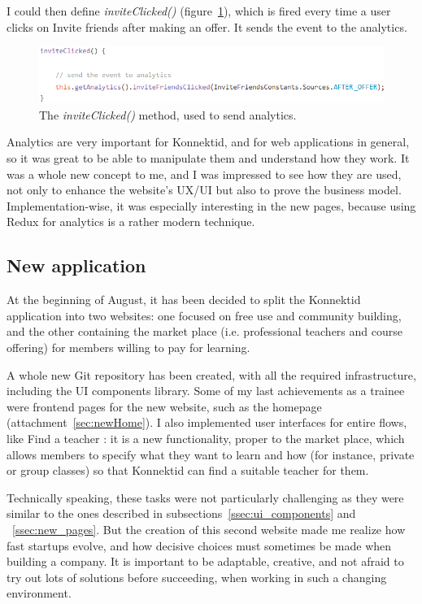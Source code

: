 I could then define \textit{inviteClicked()} ({\sc figure}~\ref{fig:inviteClicked}), which is fired every time a user clicks on Invite friends after making an offer. It sends the event to the analytics. 

\begin{figure}[H]
    \centering
    \includegraphics[scale=0.9]{figure/inviteClicked.png}
    \caption{The \textit{inviteClicked()} method, used to send analytics.}
    \label{fig:inviteClicked}
\end{figure}

Analytics are very important for Konnektid, and for web applications in general, so it was great to be able to manipulate them and understand how they work. It was a whole new concept to me, and I was impressed to see how they are used, not only to enhance the website's UX/UI but also to prove the business model. Implementation-wise, it was especially interesting in the new pages, because using Redux for analytics is a rather modern technique.

\subsection{New application}
\label{ssec:newApp}

At the beginning of August, it has been decided to split the Konnektid application into two websites: one focused on free use and community building, and the other containing the market place (i.e. professional teachers and course offering) for members willing to pay for learning. 

A whole new Git repository has been created, with all the required infrastructure, including the UI components library. Some of my last achievements as a trainee were frontend pages for the new website, such as the homepage ({\sc attachment}~\ref{sec:newHome}). I also implemented user interfaces for entire flows, like \guillemotleft{} Find a teacher \guillemotright{}: it is a new functionality, proper to the market place, which allows members to specify what they want to learn and how (for instance, private or group classes) so that Konnektid can find a suitable teacher for them.

Technically speaking, these tasks were not particularly challenging as they were similar to the ones described in {\sc subsections}~\ref{ssec:ui_components} and ~\ref{ssec:new_pages}. But the creation of this second website made me realize how fast startups evolve, and how decisive choices must sometimes be made when building a company. It is important to be adaptable, creative, and not afraid to try out lots of solutions before succeeding, when working in such a changing environment.